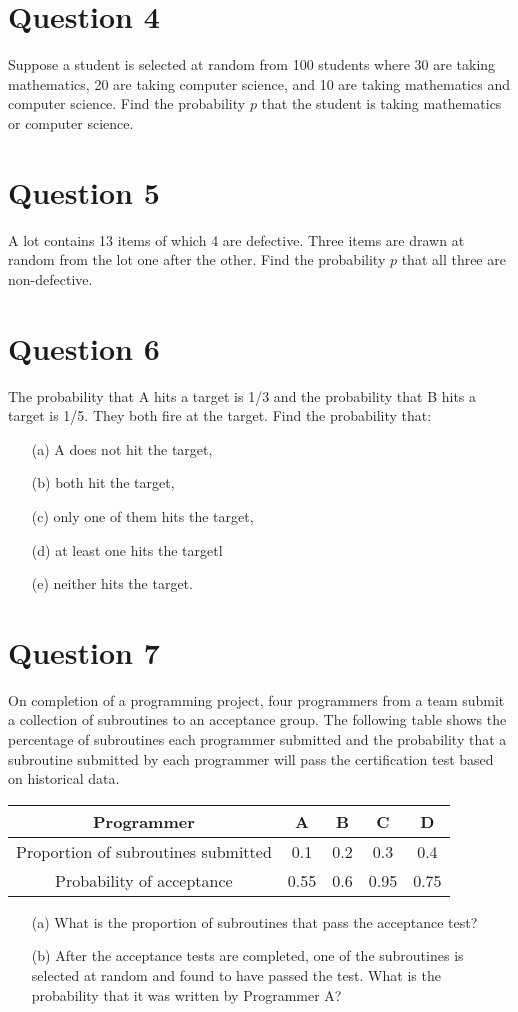 \documentclass[a4paper,12pt]{article}
\begin{document}
\section*{Question 4}
Suppose a student is selected at random from 100 students where 30 are taking mathematics, 20 are taking computer science, and 10 are taking mathematics and computer science. Find the probability $p$ that the student is taking mathematics or computer science.

\section*{Question 5}
A lot contains 13 items of which 4 are defective. Three items are drawn at random from the lot one after the other. Find the probability $p$ that all three are non-defective.

\section*{Question 6}
The probability that A hits a target is 1/3 and the probability that B hits a target is 1/5.  They both fire at the target. Find the probability that:
\begin{itemize}
\item[(a)] A does not hit the target, 
\item[(b)] both hit the target, 
\item[(c)] only one of them hits the target,
\item[(d)] at least one hits the targetl
\item[(e)] neither hits the target.
\end{itemize}

\section*{Question 7}
On completion of a programming project, four programmers from a team submit a collection of subroutines to an acceptance group. The following table shows the percentage of subroutines each programmer submitted and the probability that a subroutine submitted by each programmer will pass the certification test based on historical data.

\begin{tabular}{|c|c|c|c|c|}
\hline Programmer	&	A	&	B	&	C	&	D	 \\ \hline
Proportion of subroutines submitted	&	0.1	&	0.2	&	0.3	&	0.4	 \\ \hline
Probability of acceptance	&	0.55	&	0.6	&	0.95	&	0.75	 \\ \hline
\end{tabular} 
\begin{itemize}
\item[(a)] What is the proportion of subroutines that pass the acceptance test?
\item[(b)] After the acceptance tests are completed, one of the subroutines is selected at random and found to have passed the test. What is the probability that it was written by Programmer A?
\end{itemize}
\end{document}
